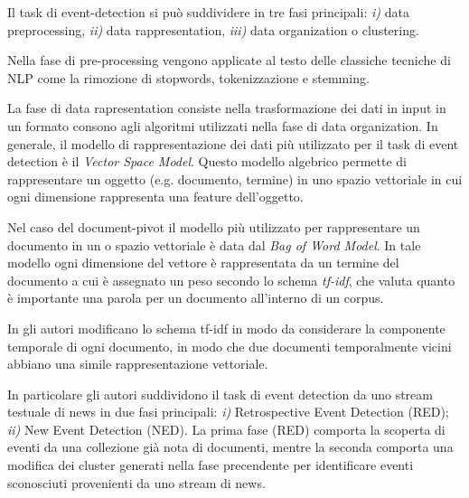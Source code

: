 \color{black}
Il task di event-detection si può suddividere in tre fasi principali: \emph{i)} data preprocessing, \emph{ii)} data rappresentation, \emph{iii)} data organization o clustering.

Nella fase di pre-processing vengono applicate al testo delle classiche tecniche di NLP come la rimozione di stopwords, tokenizzazione e stemming.

La fase di data rapresentation consiste nella trasformazione dei dati in input in un formato consono agli algoritmi utilizzati nella fase di data organization.
In generale, il modello di rappresentazione dei dati più utilizzato per il task di event detection è il \emph{Vector Space Model}. Questo modello algebrico permette di rappresentare un oggetto (e.g. documento, termine) in uno spazio vettoriale in cui ogni dimensione rappresenta una feature dell'oggetto.

Nel caso del document-pivot il modello più utilizzato per rappresentare un documento in un o spazio vettoriale è data dal \emph{Bag of Word Model}. In tale modello ogni dimensione del vettore è rappresentata da un termine del documento %
a cui è  
 assegnato un peso secondo lo schema \emph{tf-idf}\cite{Salton:1989:ATP:77013}, che valuta quanto è importante una parola per un documento all'interno di un corpus. 
 
 
In \cite{Yang:1998:SRO:290941.290953} gli autori modificano lo schema tf-idf in modo da considerare la componente temporale di ogni documento, in modo che due documenti temporalmente vicini abbiano una simile rappresentazione vettoriale. 

In particolare gli autori suddividono il task di event detection da uno stream testuale di news in due fasi principali:
\emph{i)} Retrospective Event Detection (RED); \emph{ii)}  New Event Detection (NED). La prima fase (RED) comporta la scoperta di eventi da una collezione già nota di documenti, mentre
la seconda comporta una modifica dei cluster generati nella fase precendente per identificare eventi sconosciuti provenienti da uno stream di news. 

